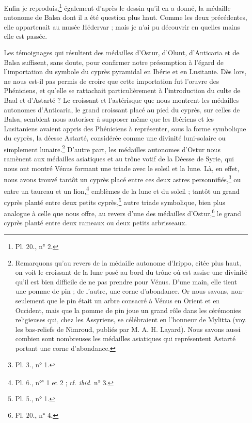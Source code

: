 \documentclass{article}
\begin{document}
Enfin je reproduis,\footnote{Pl. 20., n° 2.} également d'après le dessin qu'il en a donné, la médaille autonome de Balsa dont il a été question plus haut. Comme les deux précédentes, elle appartenait au musée Hédervar ; mais je n'ai pu découvrir en quelles mains elle est passée.

Les témoignages qui résultent des médailles d'Ostur, d'Olunt, d'Anticaria et de Balsa suffisent, sans doute, pour confirmer notre présomption à l'égard de l'importation du symbole du cyprès pyramidal en Ibérie et en Lusitanie. Dès lors, ne nous est-il pas permis de croire que cette importation fut l'œuvre des Phéniciens, et qu'elle se rattachait particulièrement à l'introduction du culte de Baal et d'Astarté ? Le croissant et l'astérisque que nous montrent les médailles autonomes d'Anticaria, le grand croissant placé au pied du cyprès, sur celles de Balsa, semblent nous autoriser à supposer même que les Ibériens et les Lusitaniens avaient appris des Phéniciens à représenter, sous la forme symbolique du cyprès, la déesse Astarté, considérée comme une divinité luni-solaire ou simplement lunaire.\footnote{Remarquons qu'au revers de la médaille autonome d'Irippo, citée plus haut, on voit le croissant de la lune posé au bord du trône où est assise une divinité qu'il est bien difficile de ne pas prendre pour Vénus. D'une main, elle tient une pomme de pin ; de l'autre, une corne d'abondance. Or nous savons, non-seulement que le pin était un arbre consacré à Vénus en Orient et en Occident, mais que la pomme de pin joue un grand rôle dans les cérémonies religieuses qui, chez les Assyriens, se célébraient en l'honneur de Mylitta (voy. les bas-reliefs de Nimroud, publiés par M. A. H. Layard). Nous savons aussi combien sont nombreuses les médailles asiatiques qui représentent Astarté portant une corne d'abondance.} D'autre part, les médailles autonomes d'Ostur nous ramènent aux médailles asiatiques et au trône votif de la Déesse de Syrie, qui nous ont montré Vénus formant une triade avec le soleil et la lune. Là, en effet, nous avons trouvé tantôt un cyprès placé entre ces deux astres personnifiés,\footnote{Pl. 3., n° 1.} ou entre un taureau et un lion,\footnote{Pl. 6., n°\textsuperscript{s} 1 et 2 ; cf. \emph{ibid.} n° 3.} emblèmes de la lune et du soleil ; tantôt un grand cyprès planté entre deux petits cyprès,\footnote{Pl. 5., n° 1.} autre triade symbolique, bien plus analogue à celle que nous offre, au revers d'une des médailles d'Ostur,\footnote{Pl. 20., n° 4.} le grand cyprès planté entre deux rameaux ou deux petits arbrisseaux.
\end{document}

